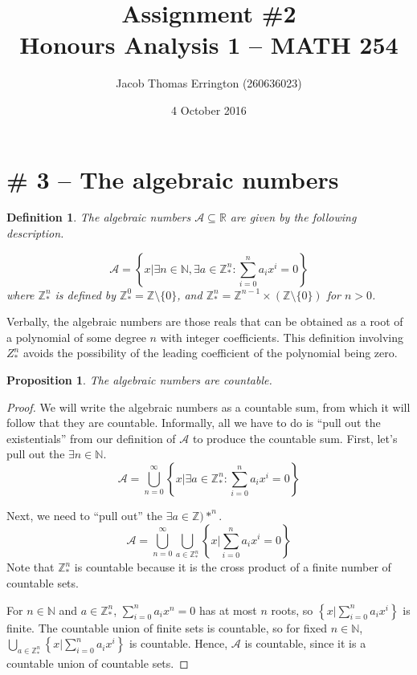 \documentclass[letterpaper,11pt]{article}
\author{Jacob Thomas Errington (260636023)}
\title{Assignment \#2\\Honours Analysis 1 -- MATH 254}
\date{4 October 2016}
\newcommand{\R}{\mathbb{R}}
\newcommand{\N}{\mathbb{N}}
\newcommand{\Z}{\mathbb{Z}}
\newcommand{\A}{\mathcal{A}}
\newcommand{\Union}{\bigcup}
\newtheorem{prop}{Proposition}
\newtheorem{definition}{Definition}
\begin{document}
\maketitle

\section*{\# 3 -- The algebraic numbers}

\begin{definition}
    The algebraic numbers $\A \subseteq \R$ are given by the following
    description.

    \begin{equation*}
        \A = \left\{
            x | \exists n \in \N, \exists a \in \Z_*^n :
            \sum_{i=0}^n {a_i x^i} = 0
        \right\}
    \end{equation*}
    where $\Z_*^n$ is defined by $\Z_*^0 = \Z \setminus \{0\}$, and
    $\Z_*^n = \Z^{n-1} \times (\Z \setminus \{0\})$ for $n > 0$.
\end{definition}

Verbally, the algebraic numbers are those reals that can be obtained as a root
of a polynomial of some degree $n$ with integer coefficients.  This definition
involving $Z_*^n$ avoids the possibility of the leading coefficient of the
polynomial being zero.

\begin{prop}
    The algebraic numbers are countable.
\end{prop}

\begin{proof}
    We will write the algebraic numbers as a countable sum, from which it will
    follow that they are countable. Informally, all we have to do is ``pull out
    the existentials'' from our definition of $\A$ to produce the countable
    sum. First, let's pull out the $\exists n \in \N$.
    \begin{equation*}
        \A = \Union_{n=0}^\infty \left\{
            x | \exists a \in \Z_*^n :
            \sum_{i=0}^n {a_i x^i} = 0
        \right\}
    \end{equation*}

    Next, we need to ``pull out'' the $\exists a \in \Z)*^n$.
    \begin{equation*}
        \A = \Union_{n=0}^\infty {
            \Union_{a \in \Z_*^n} \left\{
                x | \sum_{i=0}^n {a_i x^i} = 0
            \right\}
        }
    \end{equation*}
    Note that $\Z_*^n$ is countable because it is the cross product of a finite
    number of countable sets.

    For $n \in \N$ and $a \in \Z_*^n$, $\sum_{i=0}^n {a_i x^n} = 0$ has at
    most $n$ roots, so $\left\{ x | \sum_{i=0}^n {a_i x^i} \right\}$ is finite.
    The countable union of finite sets is countable, so for fixed $n \in \N$,
    $\Union_{a \in \Z_*^n} \left\{ x | \sum_{i=0}^n {a_i x^i} \right\}$ is
    countable.  Hence, $\A$ is countable, since it is a countable union of
    countable sets.
\end{proof}
\end{document}
